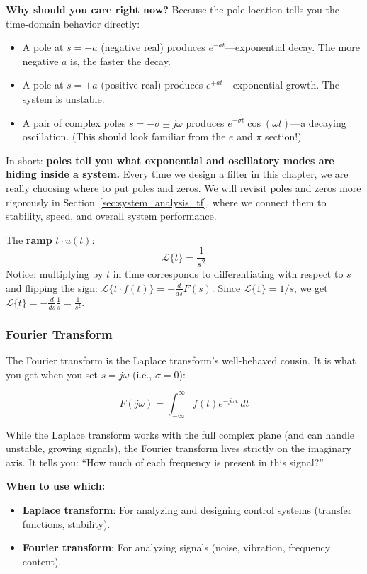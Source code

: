 \textbf{Why should you care right now?} Because the pole location tells you the time-domain behavior directly:
\begin{itemize}[nosep]
    \item A pole at $s = -a$ (negative real) produces $e^{-at}$---exponential decay. The more negative $a$ is, the faster the decay.
    \item A pole at $s = +a$ (positive real) produces $e^{+at}$---exponential growth. The system is unstable.
    \item A pair of complex poles $s = -\sigma \pm j\omega$ produces $e^{-\sigma t}\cos(\omega t)$---a decaying oscillation. (This should look familiar from the $e$ and $\pi$ section!)
\end{itemize}

In short: \textbf{poles tell you what exponential and oscillatory modes are hiding inside a system.} Every time we design a filter in this chapter, we are really choosing where to put poles and zeros. We will revisit poles and zeros more rigorously in Section~\ref{sec:system_analysis_tf}, where we connect them to stability, speed, and overall system performance.

The \textbf{ramp} $t \cdot u(t)$:
\[
\mathcal{L}\{t\} = \frac{1}{s^2}
\]
Notice: multiplying by $t$ in time corresponds to differentiating with respect to $s$ and flipping the sign: $\mathcal{L}\{t \cdot f(t)\} = -\frac{d}{ds}F(s)$. Since $\mathcal{L}\{1\} = 1/s$, we get $\mathcal{L}\{t\} = -\frac{d}{ds}\frac{1}{s} = \frac{1}{s^2}$.

\subsubsection{Fourier Transform}

The Fourier transform is the Laplace transform's well-behaved cousin. It is what you get when you set $s = j\omega$ (i.e., $\sigma = 0$):

\begin{equation}
F(j\omega) = \int_{-\infty}^{\infty} f(t) e^{-j\omega t} \, dt
\end{equation}

While the Laplace transform works with the full complex plane (and can handle unstable, growing signals), the Fourier transform lives strictly on the imaginary axis. It tells you: ``How much of each frequency is present in this signal?''

\textbf{When to use which:}
\begin{itemize}
    \item \textbf{Laplace transform}: For analyzing and designing control systems (transfer functions, stability).
    \item \textbf{Fourier transform}: For analyzing signals (noise, vibration, frequency content).
\end{itemize}

